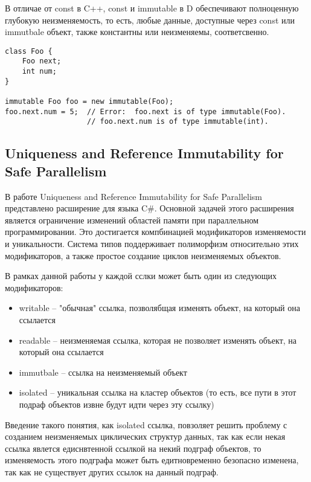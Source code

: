 В отличае от const в C++, const и immutable в D обеспечивают полноценную глубокую неизменяемость, то есть, любые данные, доступные через const или immutbale объект, также константны или неизменяемы, соответсвенно.

\begin{lstlisting}[caption=const vs immutable, label=code:d_const_vs_immutable]
class Foo {
    Foo next;
    int num;
}
 
immutable Foo foo = new immutable(Foo);
foo.next.num = 5;  // Error:  foo.next is of type immutable(Foo).
                   // foo.next.num is of type immutable(int).
\end{lstlisting}

\subsection{Uniqueness and Reference Immutability for Safe Parallelism}

В работе Uniqueness and Reference Immutability for Safe Parallelism представлено расширение для языка C\#. Основной задачей этого расширения является ограничение изменений областей памяти при параллельном программировании. Это достигается компбинацией модификаторов изменяемости и уникальности. Система типов поддерживает полиморфизм относительно этих модификаторов, а также простое создание циклов неизменяемых объектов.

В рамках данной работы у каждой сслки может быть один из следующих модификаторов:
\begin{itemize}
\item writable -- "обычная" ссылка, позволябщая изменять объект, на который она ссылается
\item readable -- неизменяемая ссылка, которая не позволяет изменять объект, на который она ссылается
\item immutbale -- ссылка на неизменяемый объект
\item isolated -- уникальная ссылка на кластер объектов (то есть, все пути в этот подраф объектов извне будут идти через эту ссылку)
\end{itemize}

Введение такого понятия, как isolated ссылка, повзоляет решить проблему с созданием неизменяемых циклических структур данных, так как если некая ссылка явлется едиснвтенной ссылкой на некий подграф объектов, то изменяемость этого подграфа может быть едитновременно безопасно изменена, так как не существует других ссылок на данный подграф. 


